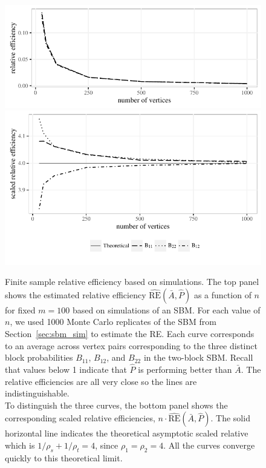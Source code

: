 \begin{figure}
\centering
\includegraphics[width=1\textwidth]{./Figures/RE.pdf}
\includegraphics[width=1\textwidth]{./Figures/scaled_RE.pdf}
\caption[Finite sample relative efficiency based on simulations]{Finite sample relative efficiency based on simulations.
The top panel shows the estimated relative efficiency $\hat{\mathrm{RE}}(\bar{A},\hat{P})$ as a function of $n$ for fixed $m=100$ based on simulations of an SBM. 
For each value of $n$, we used 1000 Monte Carlo replicates of the SBM from Section~\ref{sec:sbm_sim} to estimate the RE.
Each curve corresponds to an average across vertex pairs corresponding to the three distinct block probabilities $B_{11}$, $B_{12}$, and $B_{22}$ in the two-block SBM.
Recall that values below 1 indicate that $\hat{P}$ is performing better than $\bar{A}$.
The relative efficiencies are all very close so the lines are indistinguishable. \\
To distinguish the three curves, the bottom panel shows the corresponding scaled relative efficiencies, $n \cdot \hat{\mathrm{RE}}(\bar{A},\hat{P})$.
The solid horizontal line indicates the theoretical asymptotic scaled relative which is  $1/\rho_s+1/\rho_t=4$, since $\rho_1=\rho_2=4$.
All the curves converge quickly to this theoretical limit. }
\label{fig:RE}
\end{figure}


